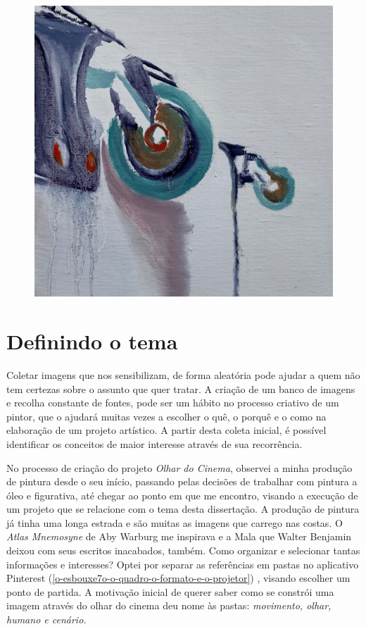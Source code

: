 \begin{figure}
\begin{minipage}[b]{.25\linewidth}
	\includegraphics[width=.6\linewidth]{figuras/boudet-retrat-na-parede-2021.pdf.compressed.pdf}
\end{minipage}
\end{figure}

\section{Definindo o tema}\label{definindo-o-tema}

Coletar imagens que nos sensibilizam, de forma aleatória pode ajudar a
quem não tem certezas sobre o assunto que quer tratar. A criação de um
banco de imagens e recolha constante de fontes, pode ser um hábito no
processo criativo de um pintor, que o ajudará muitas vezes a escolher o
quê, o porquê e o como na elaboração de um projeto artístico. A partir
desta coleta inicial, é possível identificar os conceitos de maior
interesse através de sua recorrência.

No processo de criação do projeto \emph{Olhar do Cinema}, observei a
minha produção de pintura desde o seu início, passando pelas decisões
de trabalhar com pintura a óleo e figurativa, até chegar ao ponto em
que me encontro, visando a execução de um projeto que se relacione com
o tema desta dissertação. A produção de pintura já tinha uma longa
estrada e são muitas as imagens que carrego nas costas. O \emph{Atlas
	Mnemosyne} de Aby Warburg me inspirava e a Mala que Walter Benjamin
deixou com seus escritos inacabados, também. Como organizar e
selecionar tantas informações e interesses? Optei por separar as
referências em pastas no aplicativo Pinterest (\cref{o-esbouxe7o-o-quadro-o-formato-e-o-projetor})
, visando escolher um
ponto de partida. A motivação inicial de querer saber como se constrói
uma imagem através do olhar do cinema deu nome às pastas:
\emph{movimento, olhar, humano e cenário.}

